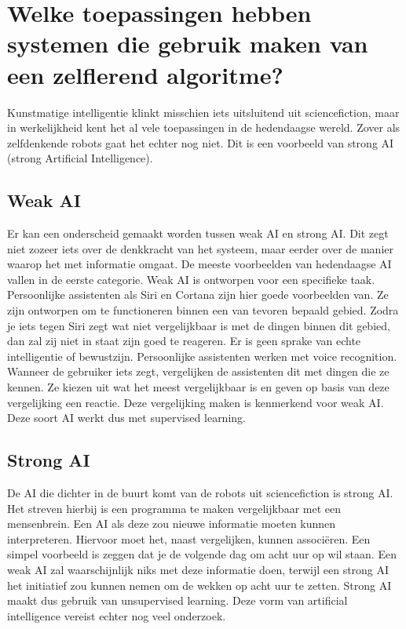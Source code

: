 \section{Welke toepassingen hebben systemen die gebruik maken van een zelflerend algoritme?}
Kunstmatige intelligentie klinkt misschien iets uitsluitend uit sciencefiction, maar in werkelijkheid kent het al vele toepassingen in de hedendaagse wereld. Zover als zelfdenkende robots gaat het echter nog niet. Dit is een voorbeeld van strong AI (strong Artificial Intelligence).

\subsection{Weak AI}
Er kan een onderscheid gemaakt worden tussen weak AI en strong AI. Dit zegt niet zozeer iets over de denkkracht van het systeem, maar eerder over de manier waarop het met informatie omgaat.
De meeste voorbeelden van hedendaagse AI vallen in de eerste categorie. Weak AI is ontworpen voor een specifieke taak. Persoonlijke assistenten als Siri en Cortana zijn hier goede voorbeelden van. Ze zijn ontworpen om te functioneren binnen een van tevoren bepaald gebied. Zodra je iets tegen Siri zegt wat niet vergelijkbaar is met de dingen binnen dit gebied, dan zal zij niet in staat zijn goed te reageren. Er is geen sprake van echte intelligentie of bewustzijn.
Persoonlijke assistenten werken met voice recognition. Wanneer de gebruiker iets zegt, vergelijken de assistenten dit met dingen die ze kennen. Ze kiezen uit wat het meest vergelijkbaar is en geven op basis van deze vergelijking een reactie. Deze vergelijking maken is kenmerkend voor weak AI. Deze soort AI werkt dus met supervised learning.

\subsection{Strong AI}
De AI die dichter in de buurt komt van de robots uit sciencefiction is strong AI. Het streven hierbij is een programma te maken vergelijkbaar met een mensenbrein. \cite{Searle} Een AI als deze zou nieuwe informatie moeten kunnen interpreteren. Hiervoor moet het, naast vergelijken, kunnen associëren. Een simpel voorbeeld is zeggen dat je de volgende dag om acht uur op wil staan. Een weak AI zal waarschijnlijk niks met deze informatie doen, terwijl een strong AI het initiatief zou kunnen nemen om de wekken op acht uur te zetten. Strong AI maakt dus gebruik van unsupervised learning.
Deze vorm van artificial intelligence vereist echter nog veel onderzoek.

